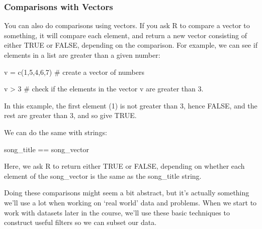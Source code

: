 \documentclass[
  letterpaper,
  DIV=11,
  numbers=noendperiod]{scrreprt}
\newenvironment{Shaded}{\begin{snugshade}}{\end{snugshade}}
\newcommand{\NormalTok}[1]{\textcolor[rgb]{0.00,0.23,0.31}{#1}}
\begin{document}
\subsubsection{Comparisons with Vectors}\label{comparisons-with-vectors}

You can also do comparisons using vectors. If you ask R to compare a
vector to something, it will compare each element, and return a new
vector consisting of either TRUE or FALSE, depending on the comparison.
For example, we can see if elements in a list are greater than a given
number:

\begin{Shaded}
\begin{Highlighting}[]
\NormalTok{v = c(1,5,4,6,7) \# create a vector of numbers}

\NormalTok{v \textgreater{} 3 \# check if the elements in the vector v are greater than 3.}
\end{Highlighting}
\end{Shaded}

In this example, the first element (1) is not greater than 3, hence
FALSE, and the rest are greater than 3, and so give TRUE.

We can do the same with strings:

\begin{Shaded}
\begin{Highlighting}[]

\NormalTok{song\_title == song\_vector}
\end{Highlighting}
\end{Shaded}

Here, we ask R to return either TRUE or FALSE, depending on whether each
element of the song\_vector is the same as the song\_title string.

\begin{tcolorbox}[enhanced jigsaw, coltitle=black, bottomrule=.15mm, title=\textcolor{quarto-callout-tip-color}{\faLightbulb}\hspace{0.5em}{Why do we need comparisons?}, leftrule=.75mm, colframe=quarto-callout-tip-color-frame, breakable, toprule=.15mm, opacityback=0, bottomtitle=1mm, toptitle=1mm, colback=white, rightrule=.15mm, titlerule=0mm, left=2mm, arc=.35mm, opacitybacktitle=0.6, colbacktitle=quarto-callout-tip-color!10!white]

Doing these comparisons might seem a bit abstract, but it's actually
something we'll use a lot when working on `real world' data and
problems. When we start to work with datasets later in the course, we'll
use these basic techniques to construct useful filters so we can subset
our data.

\end{tcolorbox}
\end{document}
